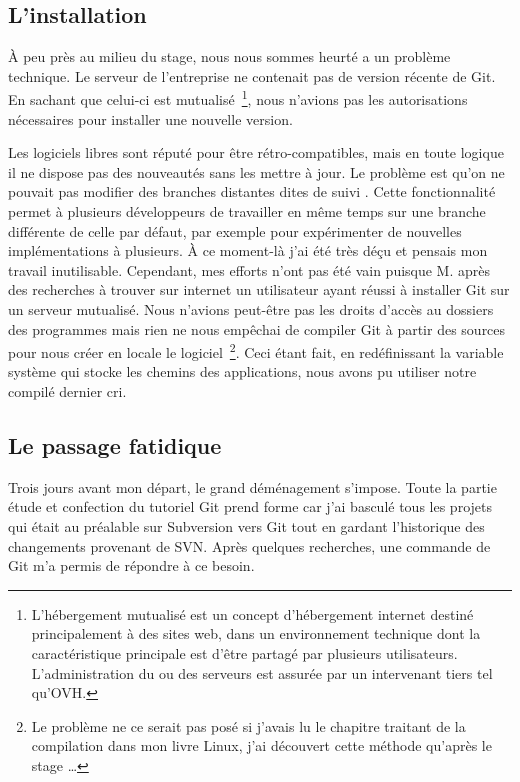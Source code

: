 \subsection{L'installation} %

À peu près au milieu du stage, nous nous sommes heurté a un problème technique.
Le serveur de l'entreprise ne contenait pas de version récente de Git. En
sachant que celui-ci est mutualisé\, \footnote{L'hébergement mutualisé est un
concept d'hébergement internet destiné principalement à des sites web, dans un
environnement technique dont la caractéristique principale est d'être partagé
par plusieurs utilisateurs. L'administration du ou des serveurs est assurée par
un intervenant tiers tel qu'OVH.}, nous n'avions pas les autorisations
nécessaires pour installer une nouvelle version.

Les logiciels libres sont réputé pour être rétro-compatibles, mais en toute
logique il ne dispose pas des nouveautés sans les mettre à jour. Le problème
est qu'on ne pouvait pas modifier des branches distantes dites \og de suivi
\fg{}. Cette fonctionnalité permet à plusieurs développeurs de travailler en
même temps sur une branche différente de celle par défaut, par exemple pour
expérimenter de nouvelles implémentations à plusieurs. À ce moment-là j'ai été
très déçu et pensais mon travail inutilisable. Cependant, mes efforts n'ont pas
été vain puisque M. après des recherches à trouver sur internet un
utilisateur ayant réussi à installer Git sur un serveur mutualisé. Nous
n'avions peut-être pas les droits d'accès au dossiers des programmes mais rien
ne nous empêchai de compiler Git à partir des sources pour nous créer en locale
le logiciel\, \footnote{Le problème ne ce serait pas posé si j'avais lu le
chapitre traitant de la compilation dans mon livre Linux, j'ai découvert cette
méthode qu'après le stage \ldots{}}. Ceci étant fait, en redéfinissant la variable
système qui stocke les chemins des applications, nous avons pu utiliser notre
compilé dernier cri.


\subsection{Le passage fatidique} %

Trois jours avant mon départ, le grand déménagement s'impose. Toute la partie
étude et confection du tutoriel Git prend forme car j'ai basculé tous les
projets qui était au préalable sur Subversion vers Git tout en gardant
l'historique des changements provenant de SVN. Après quelques recherches, une
commande de Git m'a permis de répondre à ce besoin.

